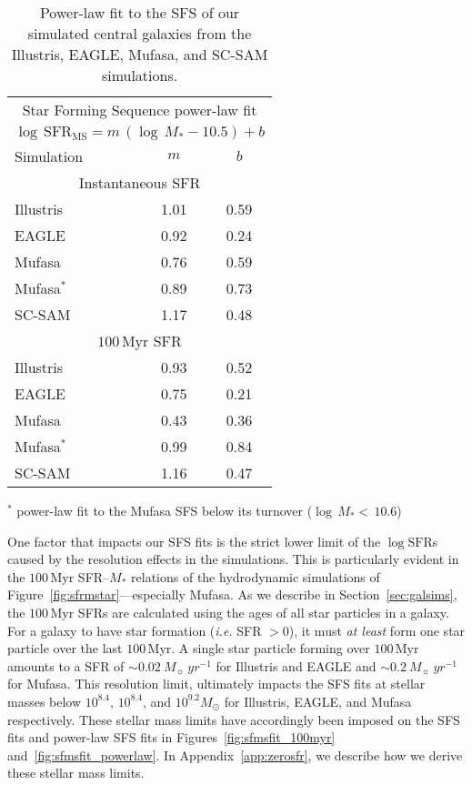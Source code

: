 \documentclass[preprint2,tighten]{aastex62}
\begin{document}
\begin{table}
\caption{Power-law fit to the SFS of our simulated central galaxies from the
Illustris, EAGLE, {\sc Mufasa}, and SC-SAM simulations.} 
\begin{center}
\begin{tabular}{p{4cm}cc} \toprule
\multicolumn{3}{c}{Star Forming Sequence power-law fit} \\ [3pt]
\multicolumn{3}{c}{$\log\,\mathrm{SFR}_\mathrm{MS} = m\,(\log\,M_* - 10.5) + b$  } \\ [3pt]
Simulation & $m$ & $b$ \\ 
\hline
\multicolumn{3}{c}{Instantaneous SFR} \\
Illustris 	& 1.01 & 0.59 \\ 
EAGLE 		& 0.92 & 0.24 \\ 
{\sc Mufasa} 		& 0.76 & 0.59 \\ 
{\sc Mufasa}$^*$ 	& 0.89 & 0.73 \\ 
SC-SAM 		& 1.17 & 0.48 \\ 
\hline \hline
\multicolumn{3}{c}{$100\,\mathrm{Myr}$ SFR} \\
Illustris 	& 0.93 & 0.52 \\
EAGLE  		& 0.75 & 0.21 \\
{\sc Mufasa}		& 0.43 & 0.36 \\
{\sc Mufasa}$^*$ 	& 0.99 & 0.84 \\ 
SC-SAM 		& 1.16 & 0.47 \\ 
\hline
\end{tabular} \label{tab:sfms_powerlaw}
\end{center}
$^*$ power-law fit to the {\sc Mufasa} SFS below its turnover ($\log\,M_* {<}\,10.6$)
\end{table}

One factor that impacts our SFS fits is the strict lower limit of the 
$\log\mathrm{SFR}$s caused by the resolution effects in the simulations. 
This is particularly evident in the $100\,\mathrm{Myr}$ SFR--$M_*$ 
relations of the hydrodynamic simulations of Figure~\ref{fig:sfrmstar}---especially 
{\sc Mufasa}. As we describe in Section~\ref{sec:galsims}, the $100\,\mathrm{Myr}$ 
SFRs are  calculated using the ages of all star particles in a galaxy. For a galaxy to 
have star formation (\emph{i.e.} SFR $> 0$), it must \emph{at least} 
form one star particle over the last $100\,\mathrm{Myr}$. A single star particle 
forming over $100\,\mathrm{Myr}$ amounts to a SFR of 
${\sim}0.02\ M_{\sun}\ yr^{-1}$ for Illustris and EAGLE and
${\sim}0.2\ M_{\sun}\ yr^{-1}$ for {\sc Mufasa}. This resolution limit, ultimately 
impacts the SFS fits at stellar masses below $10^{8.4}$, $10^{8.4}$, and 
$10^{9.2}M_\odot$ for Illustris, EAGLE, and {\sc Mufasa} respectively. 
These stellar mass limits have accordingly been imposed on the SFS fits
and power-law SFS fits in Figures~\ref{fig:sfmsfit_100myr} 
and~\ref{fig:sfmsfit_powerlaw}. In Appendix~\ref{app:zerosfr}, we describe
how we derive these stellar mass limits. 
\end{document}
